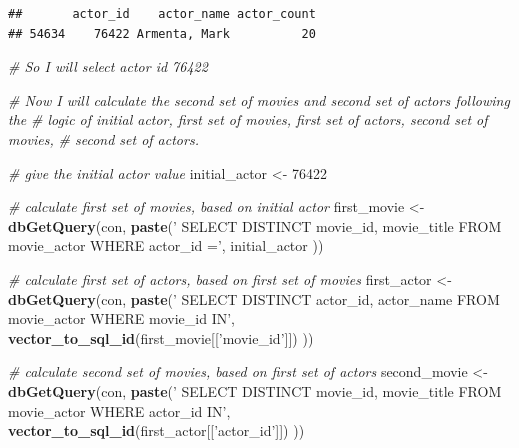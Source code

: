 \documentclass[]{article}
\newenvironment{Shaded}{\begin{snugshade}}{\end{snugshade}}
\newcommand{\KeywordTok}[1]{\textcolor[rgb]{0.13,0.29,0.53}{\textbf{{#1}}}}
\newcommand{\DecValTok}[1]{\textcolor[rgb]{0.00,0.00,0.81}{{#1}}}
\newcommand{\StringTok}[1]{\textcolor[rgb]{0.31,0.60,0.02}{{#1}}}
\newcommand{\CommentTok}[1]{\textcolor[rgb]{0.56,0.35,0.01}{\textit{{#1}}}}
\newcommand{\NormalTok}[1]{{#1}}
\begin{document}
\begin{verbatim}
##       actor_id    actor_name actor_count
## 54634    76422 Armenta, Mark          20
\end{verbatim}

\begin{Shaded}
\begin{Highlighting}[]
\CommentTok{# So I will select actor id 76422}

\CommentTok{# Now I will calculate the second set of movies and second set of actors following the}
\CommentTok{# logic of initial actor, first set of movies, first set of actors, second set of movies,}
\CommentTok{# second set of actors.}
\end{Highlighting}
\end{Shaded}

\begin{Shaded}
\begin{Highlighting}[]
\CommentTok{# give the initial actor value}
\NormalTok{initial_actor <-}\StringTok{ }\DecValTok{76422}

\CommentTok{# calculate first set of movies, based on initial actor}
\NormalTok{first_movie <-}\StringTok{ }
\StringTok{  }\KeywordTok{dbGetQuery}\NormalTok{(con, }\KeywordTok{paste}\NormalTok{(}\StringTok{'}
\StringTok{                        SELECT DISTINCT movie_id, movie_title}
\StringTok{                        FROM movie_actor}
\StringTok{                        WHERE actor_id ='}\NormalTok{, initial_actor}
  \NormalTok{))}

\CommentTok{# calculate first set of actors, based on first set of movies}
\NormalTok{first_actor <-}\StringTok{ }
\StringTok{  }\KeywordTok{dbGetQuery}\NormalTok{(con, }\KeywordTok{paste}\NormalTok{(}\StringTok{'}
\StringTok{                        SELECT DISTINCT actor_id, actor_name}
\StringTok{                        FROM movie_actor}
\StringTok{                        WHERE movie_id IN'}\NormalTok{, }\KeywordTok{vector_to_sql_id}\NormalTok{(first_movie[[}\StringTok{'movie_id'}\NormalTok{]])}
  \NormalTok{))}

\CommentTok{# calculate second set of movies, based on first set of actors}
\NormalTok{second_movie <-}\StringTok{ }
\StringTok{  }\KeywordTok{dbGetQuery}\NormalTok{(con, }\KeywordTok{paste}\NormalTok{(}\StringTok{'}
\StringTok{                        SELECT DISTINCT movie_id, movie_title}
\StringTok{                        FROM movie_actor}
\StringTok{                        WHERE actor_id IN'}\NormalTok{, }\KeywordTok{vector_to_sql_id}\NormalTok{(first_actor[[}\StringTok{'actor_id'}\NormalTok{]])}
  \NormalTok{))}


\end{Highlighting}
\end{Shaded}
\end{document}
